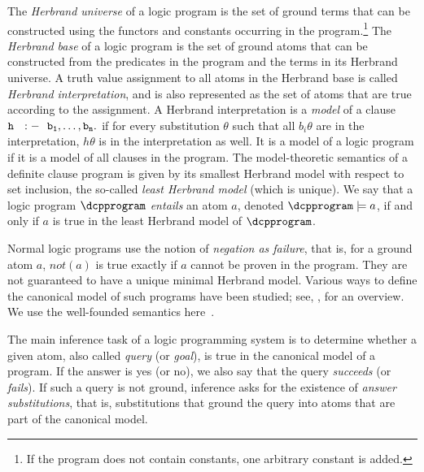 The \emph{Herbrand universe} of a logic program is the set of ground terms that can be constructed using the functors and constants occurring in the program.\footnote{If the program does not contain constants, one arbitrary constant is added.} 
The \emph{Herbrand base} of a logic program is the set of ground atoms that can be constructed from the predicates in the program and the terms in its Herbrand universe. 
A truth value assignment to all atoms in the 
Herbrand base is called \emph{Herbrand interpretation}, and is also represented as the set of atoms that are true according to the assignment. 
A Herbrand interpretation is a \emph{model} of a clause $\mathtt{h ~~:- ~~b_1,\ldots ,b_n\ldotp}$ if for every substitution $\theta$ such that all $b_i\theta$ are in the interpretation, $h\theta$ is in the interpretation as well. It is a model of a logic program if it is a model of all clauses in the program. The model-theoretic semantics of a definite clause program is given by its smallest Herbrand model with respect to set inclusion, the so-called \emph{least Herbrand model} (which is unique). We say that a logic program $\dcpprogram$ \emph{entails} an atom $a$, denoted $\dcpprogram\models a$, if and only if $a$ is true in the least Herbrand model of $\dcpprogram$.   




Normal logic programs use the notion of \emph{negation as failure}, that is, for a ground atom $a$, $not(a)$ is true exactly if $a$ cannot be proven in the program. They are not guaranteed to have a unique minimal Herbrand model. Various ways to define the canonical model of such programs have been studied; see, \eg, \citep[Chapter 3]{lloyd2012foundations} for an overview. We use the well-founded semantics here~\citep{van1991well}.

The main inference task of a logic programming system is to determine
whether a given atom, also called \emph{query} (or \emph{goal}), is true in the canonical
 model of a  program. If the answer is yes (or no), we also say that the query \emph{succeeds} (or \emph{fails}). If such a query is not ground, inference asks for the existence of  \emph{answer substitutions}, that is,  substitutions that ground the query into atoms that are part of the canonical model. 
